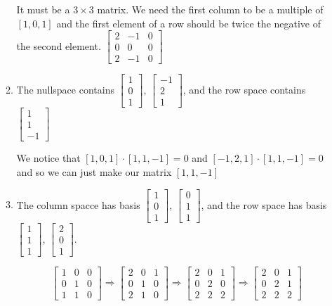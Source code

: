 \documentclass[letterpaper]{article}
\begin{document}
\begin{enumerate}
\begin{enumerate}
  It must be a $3\times 3$ matrix. We need the first column to be a multiple of $[1,0,1]$ and the first element of a row should be twice the negative of the second element.
  $\left[\begin{array}{rrr}2&-1&0\\0&0&0\\2&-1&0\end{array}\right]$
  \item
  The nullspace contains
  $\left[\begin{array}{r}1\\0\\1\end{array}\right]$,
  $\left[\begin{array}{r}-1\\2\\1\end{array}\right]$, and the row space contains
  $\left[\begin{array}{r}1\\1\\-1\end{array}\right]$

  We notice that $[1,0,1]\cdot[1,1,-1]=0$ and $[-1,2,1]\cdot[1,1,-1]=0$ and so we can just make our matrix $[1,1,-1]$
  \item
  The column spacce has basis
  $\left[\begin{array}{r}1\\0\\1\end{array}\right]$,
  $\left[\begin{array}{r}0\\1\\1\end{array}\right]$,
  and the row space has basis
  $\left[\begin{array}{r}1\\1\\1\end{array}\right]$,
  $\left[\begin{array}{r}2\\0\\1\end{array}\right]$.

  
  \[
  \left[\begin{array}{rrr}1&0&0\\0&1&0\\1&1&0\end{array}\right]\Rightarrow
  \left[\begin{array}{rrr}2&0&1\\0&1&0\\2&1&0\end{array}\right]\Rightarrow
  \left[\begin{array}{rrr}2&0&1\\0&2&0\\2&2&2\end{array}\right]\Rightarrow
  \left[\begin{array}{rrr}2&0&1\\0&2&1\\2&2&2\end{array}\right]
  \]


\end{enumerate}
\end{enumerate}
\end{document}
